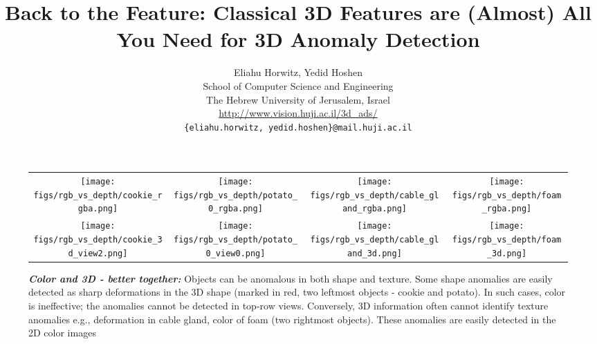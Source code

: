 \documentclass{article}
\begin{document}
\title{Back to the Feature: Classical 3D Features are (Almost) All You Need for 3D Anomaly Detection}

\author{Eliahu Horwitz, Yedid Hoshen\\
  School of Computer Science and Engineering\\
  The Hebrew University of Jerusalem, Israel\\
  \url{http://www.vision.huji.ac.il/3d_ads/}\\
  \texttt{\{eliahu.horwitz, yedid.hoshen\}@mail.huji.ac.il} \\
}

\maketitle




\begin{figure*}[h]
    \centering
   \begin{tabular}{@{\hskip1pt}c@{\hskip1pt}c@{\hskip1pt}c@{\hskip1pt}c}
            \texttt{[image: figs/rgb\_vs\_depth/cookie\_rgba.png]} & 
            \texttt{[image: figs/rgb\_vs\_depth/potato\_0\_rgba.png]} &
            \texttt{[image: figs/rgb\_vs\_depth/cable\_gland\_rgba.png]} &
            \texttt{[image: figs/rgb\_vs\_depth/foam\_rgba.png]}  \\
            \texttt{[image: figs/rgb\_vs\_depth/cookie\_3d\_view2.png]} & 
            \texttt{[image: figs/rgb\_vs\_depth/potato\_0\_view0.png]} &
            \texttt{[image: figs/rgb\_vs\_depth/cable\_gland\_3d.png]} & 
            \texttt{[image: figs/rgb\_vs\_depth/foam\_3d.png]} \\
        \end{tabular}
\caption{\textit{\textbf{Color and 3D - better together:}} Objects can be anomalous in both shape and texture. Some shape anomalies are easily detected as sharp deformations in the 3D shape (marked in red, two leftmost objects - cookie and potato). In such cases, color is ineffective; the anomalies cannot be detected in top-row views. Conversely, 3D information often cannot identify texture anomalies e.g., deformation in cable gland, color of foam (two rightmost objects). These anomalies are easily detected in the 2D color images}
\label{fig:rgb_v_d}
\end{figure*}
\end{document}
